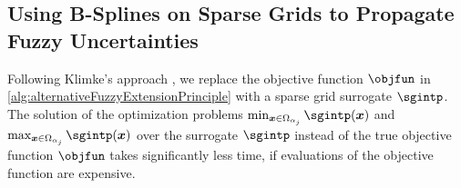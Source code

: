 \begin{algorithm}
  \begin{algorithmic}[1]
      \EndFor{}\vspace{-2mm}
    \EndFunction{}
  \end{algorithmic}
  \caption[Alternative fuzzy extension principle]{%
    Alternative fuzzy extension principle.
    Inputs are the number of $\alpha$ segments to use as discretization and
    the $d$ fuzzy intervals $\fuzzy{x}_1, \dotsc, \fuzzy{x}_d$
    (we have to be able to determine $\alpha$-cuts
    of these fuzzy input intervals).
    Output is an approximation to the output $\fuzzy{y}$
    of the alternative fuzzy extension principle
    (given by an approximation of its membership function $\memfun{y}$).%
  }%
  \label{alg:alternativeFuzzyExtensionPrinciple}%
\end{algorithm}



\subsection{Using B-Splines on Sparse Grids to Propagate Fuzzy Uncertainties}
\label{sec:553fuzzyBSplines}

Following Klimke's approach \cite{Klimke06Uncertainty},
we replace the objective function $\objfun$ in
\cref{alg:alternativeFuzzyExtensionPrinciple}
with a sparse grid surrogate $\sgintp$.
The solution of the optimization problems
$\min_{\*x \in \Omega_{\alpha_j}} \sgintp(\*x)$ and
$\max_{\*x \in \Omega_{\alpha_j}} \sgintp(\*x)$ over the
surrogate $\sgintp$ instead of the true objective function $\objfun$
takes significantly less time, if evaluations of the objective function
are expensive.

